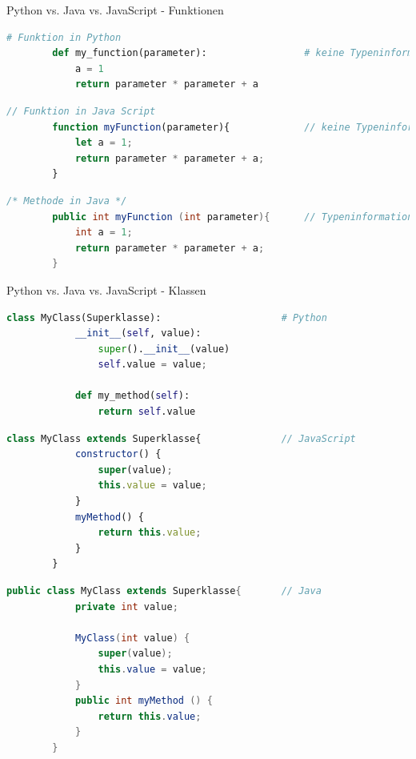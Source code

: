 \begin{frame}[fragile]{Python vs. Java vs. JavaScript - Funktionen}
    \begin{lstlisting}[language=Python, gobble=8]
        # Funktion in Python
        def my_function(parameter):                 # keine Typeninformation
            a = 1
            return parameter * parameter + a
    \end{lstlisting}
    \begin{lstlisting}[language=JavaScript, gobble=8]
        // Funktion in Java Script
        function myFunction(parameter){             // keine Typeninformation
            let a = 1;
            return parameter * parameter + a;
        }
    \end{lstlisting}
    \begin{lstlisting}[language=Java, gobble=8]
        /* Methode in Java */
        public int myFunction (int parameter){      // Typeninformation
            int a = 1;
            return parameter * parameter + a;
        }
        \end{lstlisting}
\end{frame}

\begin{frame}[fragile]{Python vs. Java vs. JavaScript - Klassen}
    \begin{lstlisting}[language=Python, gobble=8]
        class MyClass(Superklasse):                     # Python
            __init__(self, value):
                super().__init__(value)
                self.value = value;

            def my_method(self):
                return self.value
    \end{lstlisting}
    \begin{lstlisting}[language=JavaScript, gobble=8]
        class MyClass extends Superklasse{              // JavaScript
            constructor() {
                super(value);
                this.value = value;
            }
            myMethod() {
                return this.value;
            }
        }
    \end{lstlisting}
    \begin{lstlisting}[language=Java, gobble=8]
        public class MyClass extends Superklasse{       // Java
            private int value;

            MyClass(int value) {
                super(value);
                this.value = value;
            }
            public int myMethod () {
                return this.value;
            }
        }
    \end{lstlisting}
\end{frame}

